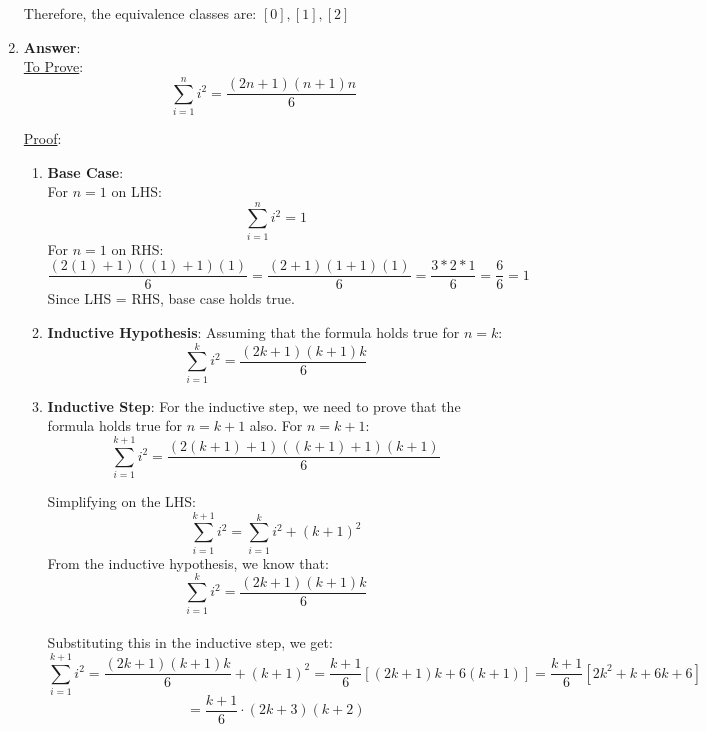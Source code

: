 \documentclass[11pt]{article}
\begin{document}
\begin{enumerate}
Therefore, the equivalence classes are:  
$[0], [1], [2]$
\pagebreak
\item \textbf{Answer}: \\
\uline{To Prove}: \\
\begin{equation*}
    \sum_{i=1}^{n} i^2 = \frac{(2n + 1)(n+1)n}{6}
\end{equation*}

\uline{Proof}: \\
\begin{enumerate}
    \item \textbf{Base Case}:\\
    For $n = 1$ on LHS:
    \begin{equation*}
        \sum_{i=1}^{n} i^2 = 1
    \end{equation*}
    For $n = 1$ on RHS:
    \begin{equation*}
        \frac{(2(1) + 1)((1)+1)(1)}{6} = \frac{(2+1)(1+1)(1)}{6} = \frac{3*2*1}{6} = \frac{6}{6} = 1
    \end{equation*}
    Since LHS = RHS, base case holds true.
    
    \item \textbf{Inductive Hypothesis}:
    Assuming that the formula holds true for $n = k$:
    \begin{equation*}
        \sum_{i=1}^{k} i^2 = \frac{(2k+1)(k+1)k}{6}
    \end{equation*}
    \item \textbf{Inductive Step}:
    For the inductive step, we need to prove that the formula holds true for $n = k + 1$ also.
    For $n = k+1$: \\
    \begin{equation*}
        \sum_{i=1}^{k+1} i^2 = \frac{(2(k+1)+1)((k+1)+1)(k+1)}{6}
    \end{equation*}

    Simplifying on the LHS:
    \begin{equation*}
        \sum_{i=1}^{k+1} i^2 = \sum_{i=1}^{k} i^2 + (k+1)^2
    \end{equation*}
    From the inductive hypothesis, we know that:
    \begin{equation*}
        \sum_{i=1}^{k} i^2 = \frac{(2k+1)(k+1)k}{6}
    \end{equation*}
    \pagebreak
    \\
    Substituting this in the inductive step, we get:
    \begin{equation*}
        \sum_{i=1}^{k+1} i^2 = \frac{(2k+1)(k+1)k}{6} + (k+1)^2 = \frac{k+1}{6}[(2k+1)k+6(k+1)] = \frac{k+1}{6}[2k^2+k+6k+6]
    \end{equation*}
    \begin{equation*}
        = \frac{k+1}{6}\cdot(2k+3)(k+2)
    \end{equation*}
    

\end{enumerate}
\end{enumerate}
\end{document}
